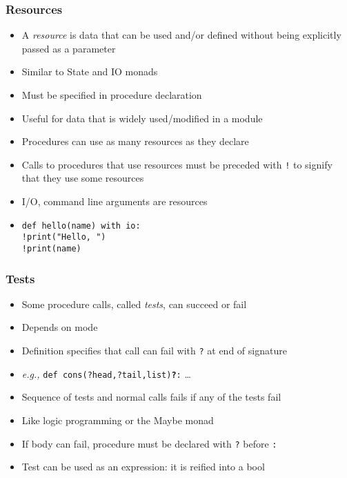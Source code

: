 \documentclass[12pt]{beamer}
\begin{document}
\begin{frame}
\frametitle{Resources}
\begin{itemize}
\item A \emph{resource} is data that can be used and/or defined
  without being explicitly passed as a parameter
\item Similar to State and IO monads
\item Must be specified in procedure declaration
\item Useful for data that is widely used/modified in a module
\item Procedures can use as many resources as they declare
\item Calls to procedures that use resources must be preceded with
  \texttt{!} to signify that they use some resources
\item I/O, command line arguments are resources
\item \texttt{def hello(name) with io:} \\
\hspace*{2em}\texttt{!print("Hello, ")} \\
\hspace*{2em}\texttt{!print(name)} \\
\end{itemize}
\end{frame}


\begin{frame}
\frametitle{Tests}
\begin{itemize}
\item Some procedure calls, called \emph{tests}, can succeed or fail
\item Depends on mode
\item Definition specifies that call can fail with \texttt{?} at end
  of signature
\item \emph{e.g.,} \texttt{def cons(?head,?tail,list)\textbf{?}:} \ldots
\item Sequence of tests and normal calls fails if any of the tests fail
\item Like logic programming or the Maybe monad
\item If body can fail, procedure must be declared with \texttt{?}
  before \texttt{:}
\item Test can be used as an expression:  it is reified into a bool
\end{itemize}
\end{frame}
\end{document}
